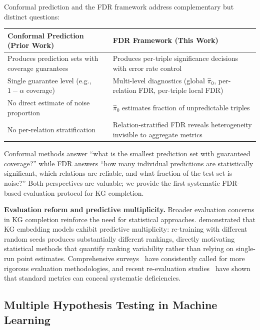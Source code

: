 Conformal prediction and the FDR framework address complementary but distinct questions:

\begin{center}
\begin{tabular}{p{} p{}}
\toprule
\textbf{Conformal Prediction (Prior Work)} & \textbf{FDR Framework (This Work)} \\
\midrule
Produces prediction sets with coverage guarantees & Produces per-triple significance decisions with error rate control \\
Single guarantee level (e.g., $1 - \alpha$ coverage) & Multi-level diagnostics (global $\hat{\pi}_0$, per-relation FDR, per-triple local FDR) \\
No direct estimate of noise proportion & $\hat{\pi}_0$ estimates fraction of unpredictable triples \\
No per-relation stratification & Relation-stratified FDR reveals heterogeneity invisible to aggregate metrics \\
\bottomrule
\end{tabular}
\end{center}

Conformal methods answer ``what is the smallest prediction set with guaranteed coverage?'' while FDR answers ``how many individual predictions are statistically significant, which relations are reliable, and what fraction of the test set is noise?''
Both perspectives are valuable; we provide the first systematic FDR-based evaluation protocol for KG completion.

\textbf{Evaluation reform and predictive multiplicity.}
Broader evaluation concerns in KG completion reinforce the need for statistical approaches.
\cite{zhu2024predictive} demonstrated that KG embedding models exhibit predictive multiplicity: re-training with different random seeds produces substantially different rankings, directly motivating statistical methods that quantify ranking variability rather than relying on single-run point estimates.
Comprehensive surveys~\cite{shen2022comprehensive,li2023knowledge,jarnac2025uncertainty} have consistently called for more rigorous evaluation methodologies, and recent re-evaluation studies~\cite{sun2020reevaluation,schwertmann2023modelagnostic} have shown that standard metrics can conceal systematic deficiencies.

\subsection{Multiple Hypothesis Testing in Machine Learning}

